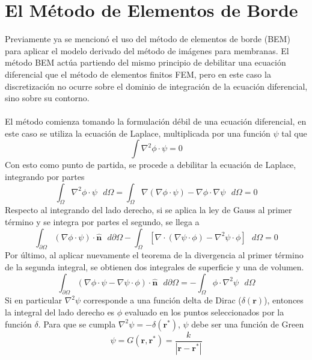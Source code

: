 \documentclass[12pt, oneside, numbers, spanish]{ezthesis}
\numberwithin{equation}{section}
\begin{document}
\section{El Método de Elementos de Borde}
Previamente ya se mencionó el uso del método de elementos de borde (BEM) para aplicar el modelo derivado del método de imágenes para membranas. El método BEM actúa partiendo del mismo principio de debilitar una ecuación diferencial que el método de elementos finitos FEM, pero en este caso la discretización no ocurre sobre el dominio de integración de la ecuación diferencial, sino sobre su contorno.\\\\
El método comienza tomando la formulación débil de una ecuación diferencial, en este caso se utiliza la ecuación de Laplace, multiplicada por una función $\psi$ tal que
\begin{equation}
\int\nabla^2 \phi\cdot\psi = 0
\end{equation}
Con esto como punto de partida, se procede a debilitar la ecuación de Laplace, integrando por partes
\begin{equation}
\int_\Omega \nabla^2\phi\cdot\psi\text{ }d\Omega = \int_\Omega \nabla(\nabla \phi\cdot\psi) - \nabla\phi\cdot\nabla\psi\text{ }d\Omega = 0
\end{equation}
Respecto al integrando del lado derecho, si se aplica la ley de Gauss al primer término y se integra por partes el segundo, se llega a
\begin{equation}
\int_{\partial\Omega} (\nabla\phi\cdot\psi)\cdot\hat{\mathbf{n}}\text{ }d\partial\Omega - \int_\Omega [\nabla\cdot(\nabla\psi\cdot\phi) - \nabla^2\psi\cdot\phi]\text{ }d\Omega = 0
\end{equation}
Por último, al aplicar nuevamente el teorema de la divergencia al primer término de la segunda integral, se obtienen dos integrales de superficie y una de volumen.
\begin{equation}
\int_{\partial\Omega} (\nabla\phi\cdot\psi - \nabla\psi\cdot\phi) \cdot\hat{\mathbf{n}}\text{ }d\partial\Omega = -\int_\Omega \phi\cdot\nabla^2\psi\text{ }d\Omega
\end{equation}
Si en particular $\nabla^2\psi$ corresponde a una función delta de Dirac ($\delta(\mathbf{r})$), entonces la integral del lado derecho es $\phi$ evaluado en los puntos seleccionados por la función $\delta$. Para que se cumpla $\nabla^2\psi = -\delta(\mathbf{r}^*)$, $\psi$ debe ser una función de Green
\begin{equation}
\psi = G(\mathbf{r},\mathbf{r}^*) = \frac{k}{|\mathbf{r} - \mathbf{r}^*|}
\end{equation}
\end{document}
